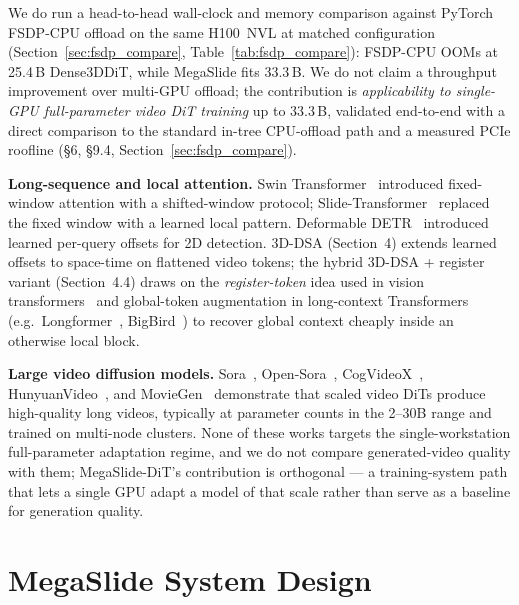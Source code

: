 \documentclass[11pt, letterpaper]{article}
\begin{document}
We do run a head-to-head wall-clock and memory comparison against PyTorch FSDP-CPU offload on the same H100~NVL at matched configuration (Section~\ref{sec:fsdp_compare}, Table~\ref{tab:fsdp_compare}): FSDP-CPU OOMs at 25.4\,B Dense3DDiT, while MegaSlide fits 33.3\,B. We do not claim a throughput improvement over multi-GPU offload; the contribution is \emph{applicability to single-GPU full-parameter video DiT training} up to 33.3\,B, validated end-to-end with a direct comparison to the standard in-tree CPU-offload path and a measured PCIe roofline (\S6, \S9.4, Section~\ref{sec:fsdp_compare}).

\textbf{Long-sequence and local attention.} Swin Transformer~\cite{liu2021swin} introduced fixed-window attention with a shifted-window protocol; Slide-Transformer~\cite{pan2023slide} replaced the fixed window with a learned local pattern. Deformable DETR~\cite{zhu2021deformable} introduced learned per-query offsets for 2D detection. 3D-DSA (Section~4) extends learned offsets to space-time on flattened video tokens; the hybrid 3D-DSA + register variant (Section~4.4) draws on the \emph{register-token} idea used in vision transformers~\cite{darcet2024registers} and global-token augmentation in long-context Transformers (e.g.\ Longformer~\cite{beltagy2020longformer}, BigBird~\cite{zaheer2020bigbird}) to recover global context cheaply inside an otherwise local block.

\textbf{Large video diffusion models.} Sora~\cite{openai2024sora}, Open-Sora~\cite{lin2024opensora}, CogVideoX~\cite{yang2024cogvideox}, HunyuanVideo~\cite{kong2024hunyuanvideo}, and MovieGen~\cite{polyak2024moviegen} demonstrate that scaled video DiTs produce high-quality long videos, typically at parameter counts in the 2--30B range and trained on multi-node clusters. None of these works targets the single-workstation full-parameter adaptation regime, and we do not compare generated-video quality with them; MegaSlide-DiT's contribution is orthogonal --- a training-system path that lets a single GPU adapt a model of that scale rather than serve as a baseline for generation quality.


\section{MegaSlide System Design}
\end{document}
